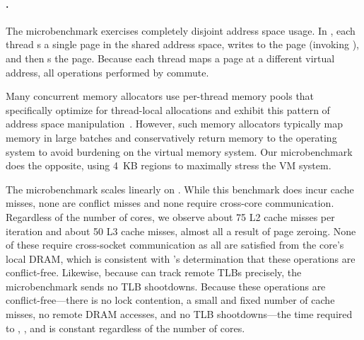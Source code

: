 \begin{figure*}
  \centering
    
    \label{fig:vm-tput:local}
    \hspace{-.25in}
    
    \label{fig:vm-tput:pipeline}
    \hspace{-.25in}
    
    \label{fig:vm-tput:global}
    \addtocounter{figure}{-1}
  \label{fig:vm-tput}
\end{figure*}

\paragraph{.} The  microbenchmark exercises
completely disjoint address space usage.
%
In , each thread s a single page in the shared
address space, writes to the page (invoking ), and
then s the page.
%
Because each thread maps a page at a different virtual address, all
operations performed by  commute.

Many concurrent memory allocators use per-thread memory pools that
specifically optimize for thread-local allocations and exhibit this
pattern of address space manipulation~\cite{jemalloc,tcmalloc}.
However, such memory allocators typically map memory in large batches
and conservatively return memory to the operating system to avoid
burdening on the virtual memory system.
%
Our microbenchmark does the opposite, using 4~KB regions to maximally
stress the VM system.

The  microbenchmark scales linearly on \sys.
%
While this benchmark does incur cache misses, none are conflict misses
and none require cross-core communication.
%
Regardless of the number of cores, we observe about 75 L2 cache misses
per iteration and about 50 L3 cache misses, almost all a result of
page zeroing.
%
None of these require cross-socket communication as all are satisfied
from the core's local DRAM, which is consistent with \tool's
determination that these operations are conflict-free.
%
Likewise, because \sys can track remote TLBs precisely, the 
microbenchmark sends no TLB shootdowns.
%
Because these operations are conflict-free---there is no lock
contention, a small and fixed number of cache misses, no remote DRAM
accesses, and no TLB shootdowns---the time required to ,
, and  is constant regardless of the
number of cores.

